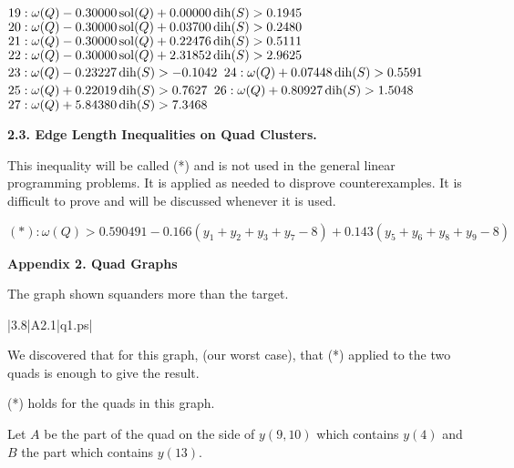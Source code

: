 $19:  \omega(Q) - 0.30000 \operatorname{sol}(Q) + 0.00000 \operatorname{dih}(S) > 0.1945$\newline
$20:  \omega(Q) - 0.30000 \operatorname{sol}(Q) + 0.03700 \operatorname{dih}(S) > 0.2480$\newline
$21:  \omega(Q) - 0.30000 \operatorname{sol}(Q) + 0.22476 \operatorname{dih}(S) > 0.5111$\newline
$22:  \omega(Q) - 0.30000 \operatorname{sol}(Q) + 2.31852 \operatorname{dih}(S) > 2.9625$\newline
$23:  \omega(Q) - 0.23227 \operatorname{dih}(S) > -0.1042$\newline
$24:  \omega(Q) + 0.07448 \operatorname{dih}(S) > 0.5591$\newline
$25:  \omega(Q) + 0.22019 \operatorname{dih}(S) > 0.7627$\newline
$26:  \omega(Q) + 0.80927 \operatorname{dih}(S) > 1.5048$\newline
$27:  \omega(Q) + 5.84380 \operatorname{dih}(S) > 7.3468$\newline



\smallskip

{\bf 2.3. Edge Length Inequalities on Quad Clusters.}

This inequality will be called (*) and is not used in the general linear programming problems.  It is applied as needed to disprove counterexamples.  It is 
difficult to prove and will be discussed whenever it is used.

\smallskip

$(*): \omega(Q) > 0.590491 -0.166(y_1+y_2+y_3+y_7-8) + 0.143 (y_5+y_6+y_8+y_9-8)$\newline

\smallskip

\bigskip



\bigskip

\centerline{\bf Appendix 2. Quad Graphs}


\bigskip

 The graph shown 
squanders more than the target.  \endproclaim


\gram|3.8|A2.1|q1.ps|  %


We discovered that for this graph, (our worst case), that (*) applied 
to the two quads is enough to give the result.

 (*) holds for the quads in this graph. \endproclaim

Let $A$ be the part of the quad on the side of $y(9,10)$ which contains $y(4)$ and $B$ the part which contains $y(13)$.



